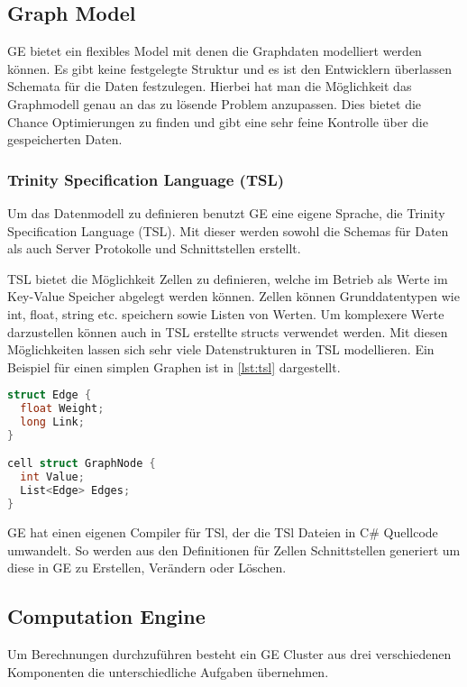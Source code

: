 \subsection{Graph Model}

GE bietet ein flexibles Model mit denen die Graphdaten modelliert werden können. Es gibt keine festgelegte Struktur und es ist den Entwicklern
überlassen Schemata für die Daten festzulegen. Hierbei hat man die Möglichkeit das Graphmodell genau an das zu lösende Problem anzupassen.
Dies bietet die Chance Optimierungen zu finden und gibt eine sehr feine Kontrolle über die gespeicherten Daten.

\subsubsection{Trinity Specification Language (TSL)}

Um das Datenmodell zu definieren benutzt GE eine eigene Sprache, die Trinity Specification Language (TSL). Mit dieser werden sowohl die Schemas
für Daten als auch Server Protokolle und Schnittstellen erstellt. 

TSL bietet die Möglichkeit Zellen zu definieren, welche im Betrieb als Werte im Key-Value Speicher abgelegt werden können.
Zellen können Grunddatentypen wie int, float, string etc. speichern sowie Listen von Werten. Um komplexere Werte darzustellen können auch in TSL erstellte structs verwendet werden.
Mit diesen Möglichkeiten lassen sich sehr viele Datenstrukturen in TSL modellieren. Ein Beispiel für einen simplen Graphen ist in  \ref{lst:tsl} dargestellt.

\begin{lstlisting}[language=c,label={lst:tsl}, caption={Beispiel für einen in TSL definierte Graphenstruktur}]
struct Edge {
  float Weight;
  long Link;
}

cell struct GraphNode {
  int Value;
  List<Edge> Edges;
}
\end{lstlisting}



GE hat einen eigenen Compiler für TSl, der die TSl Dateien in C\# Quellcode umwandelt. So werden aus den Definitionen für Zellen Schnittstellen
generiert um diese in GE zu Erstellen, Verändern oder Löschen. 

\subsection{Computation Engine}

Um Berechnungen durchzuführen besteht ein GE Cluster aus drei verschiedenen Komponenten die unterschiedliche Aufgaben übernehmen.

